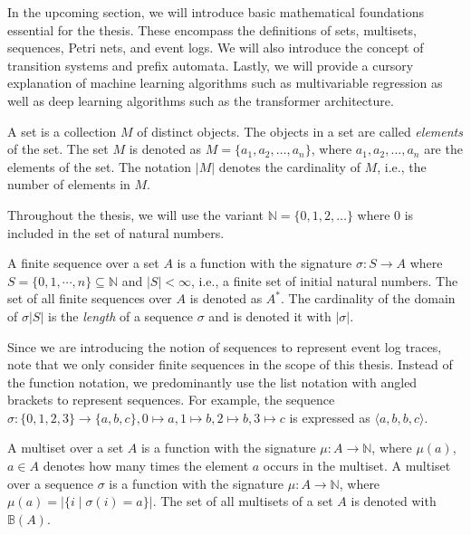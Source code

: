
In the upcoming section, we will introduce basic mathematical foundations essential for the thesis. These encompass the definitions of sets, multisets, sequences, Petri nets, and event logs. We will also introduce the concept of transition systems and prefix automata. Lastly, we will provide a cursory explanation of machine learning algorithms such as multivariable regression as well as deep learning algorithms such as the transformer architecture.

\begin{definition}[Set]
    A set is a collection $M$ of distinct objects. The objects in a set are called \emph{elements} of the set. The set $M$ is denoted as $M = \{ a_1, a_2, \dots, a_n \}$, where $a_1, a_2, \dots, a_n$ are the elements of the set. The notation $\lvert M \rvert$ denotes the cardinality of $M$, i.e., the number of elements in $M$.
\end{definition}

Throughout the thesis, we will use the variant $\mathbb{N} = \{0, 1, 2, \dots\}$ where $0$ is included in the set of natural numbers.

\begin{definition}
    A finite sequence over a set $A$ is a function with the signature $\sigma \colon S \rightarrow A$ where $S = \{0, 1, \cdots, n \} \subseteq \mathbb{N}$ and $\lvert S \rvert < \infty$, i.e., a finite set of initial natural numbers. The set of all finite sequences over $A$ is denoted as $A^*$. The cardinality of the domain of $\sigma \lvert S \rvert$  is the \emph{length} of a sequence $\sigma$ and is denoted it with $\lvert \sigma \rvert$.
\end{definition}

Since we are introducing the notion of sequences to represent event log traces, note that we only consider finite sequences in the scope of this thesis. Instead of the function notation, we predominantly use the list notation with angled brackets to represent sequences. For example, the sequence $\sigma \colon \{0, 1, 2, 3\} \rightarrow \{a, b, c\}, 0 \mapsto a, 1 \mapsto b, 2 \mapsto b, 3 \mapsto c$ is expressed as $\langle a, b, b, c \rangle$.

\begin{definition}[Multiset]
    A multiset over a set $A$ is a function with the signature $\mu \colon A \rightarrow \mathbb{N}$, where $\mu(a)$, $a \in A$ denotes how many times the element $a$ occurs in the multiset.  
    A multiset over a sequence $\sigma$ is a function with the signature $\mu \colon A \rightarrow \mathbb{N}$, where $\mu(a) = \lvert \{ i \mid \sigma(i) = a \} \rvert$. The set of all multisets of a set $A$ is denoted with $\mathbb{B}(A)$.
\end{definition}

